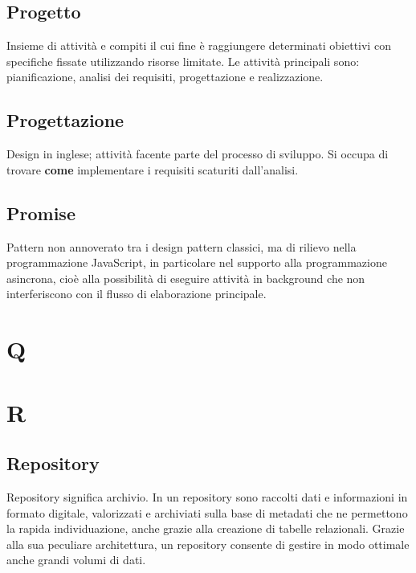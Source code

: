 \subsection*{Progetto}
Insieme di attività e compiti il cui fine è raggiungere determinati obiettivi con specifiche fissate utilizzando risorse limitate. Le attività principali sono: pianificazione, analisi dei requisiti, progettazione e realizzazione.

\subsection*{Progettazione}
Design in inglese; attività facente parte del processo di sviluppo. Si occupa di trovare \textbf{come} implementare i requisiti scaturiti dall'analisi.

\subsection*{Promise}
Pattern non annoverato tra i design pattern classici, ma di rilievo nella programmazione JavaScript, in particolare nel supporto alla programmazione asincrona, cioè alla possibilità di eseguire attività in background che non interferiscono con il flusso di elaborazione principale. 


\clearpage
\section*{Q}

\clearpage
\section*{R}

\subsection*{Repository}

Repository significa archivio. In un repository sono raccolti dati e informazioni in formato digitale, valorizzati e archiviati sulla base di metadati che ne permettono la rapida individuazione, anche grazie alla creazione di tabelle relazionali. Grazie alla sua peculiare architettura, un repository consente di gestire in modo ottimale anche grandi volumi di dati.

